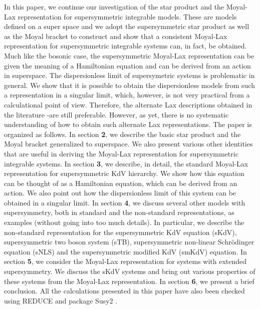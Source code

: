 \documentclass[a4paper,11pt]{article}
\begin{document}
In this paper, we continue our investigation of the star product and
the Moyal-Lax representation for supersymmetric integrable
models. These are models defined on a super space \cite{14} and we adopt the
supersymmetric star product \cite{15} as well as the Moyal bracket to
construct and show that a consistent Moyal-Lax representation for
supersymmetric
integrable systems can, in fact, be obtained. Much like the bosonic
case, the supersymmetric Moyal-Lax representation can be given the
meaning of a Hamiltonian equation and can be derived from an action in
superspace. The dispersionless limit of supersymetric systems is
problematic in general. We show that it is possible to obtain the
dispersionless models from such a representation in a singular limit,
which, however, is not very practical from a calculational point of
view. Therefore, the alternate Lax descriptions obtained in the
literature \cite{16}-\cite{17}are still preferable. However, as yet,
there  is no
systematic understanding of how to obtain such alternate Lax
representations. The paper is organized as follows. In section {\bf
2}, we describe the basic star product and the Moyal bracket
generalized to superspace. We also present various other identities
that are useful in deriving the Moyal-Lax representation for
supersymmetric integrable systems. In section {\bf 3}, we describe, in
detail, the standard Moyal-Lax representation for \coordHE{} supersymmetric
KdV hierarchy. We show how this equation can be thought of as a
Hamiltonian equation, which can be derived from an action. We also
point out how the dispersionless limit of this system can be obtained
in a singular limit. In section {\bf 4}, we discuss several other
models with \coordHE{} supersymmetry, both in standard and the non-standard
representations, as examples
(without going into too much details). In particular, we describe the
non-standard representation for the supersymmetric KdV equation (sKdV),
supersymmetric two boson system (sTB), supersymmetric non-linear
Schr\"{o}dinger equation (sNLS) and the supersymmetric modified KdV (smKdV)
equation.  In section {\bf 5}, we consider the
Moyal-Lax representation for systems with extended supersymmetry. We
discuss the \coordHE{} sKdV systems and bring out various properties of
these  systems from  the Moyal-Lax representation. In section {\bf 6},
we present a brief conclusion. All the calculations presented in this
paper have also been checked using REDUCE \cite{21} and package Susy2
\cite {22}.
\end{document}
